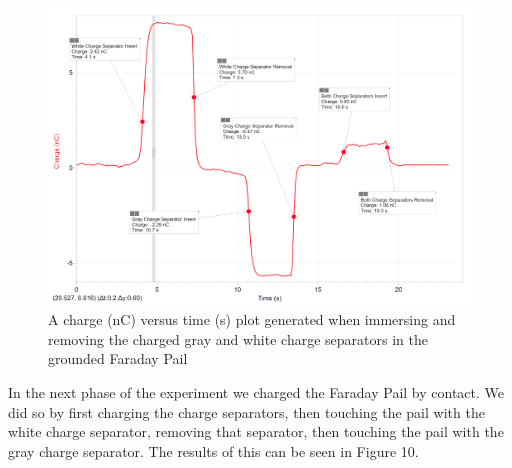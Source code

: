 \documentclass[oneside,12pt]{amsart}
\begin{document}
\begin{figure}[h]
	\includegraphics[width=\medgraph,scale=0.01]{SeparatorsBor.png}
	\caption{A charge (nC) versus time (s) plot generated when immersing and removing the charged gray and white charge separators in the grounded Faraday Pail}
	\label{BOr}
\end{figure} 
\indent In the next phase of the experiment we charged the Faraday Pail by contact. We did so by first charging the charge separators, then touching the pail with the white charge separator, removing that separator, then touching the pail with the gray charge separator. The results of this can be seen in Figure 10.\\
\end{document}
